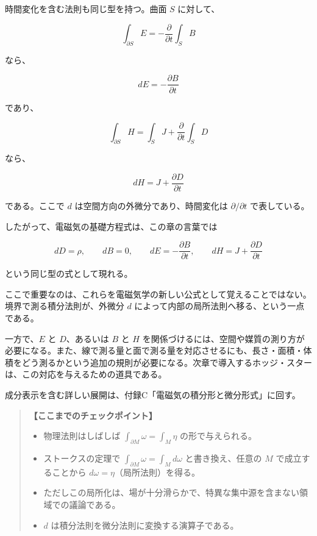 \documentclass[a4paper,12pt,openany]{book}
\begin{document}
時間変化を含む法則も同じ型を持つ。曲面 \(S\) に対して、

\[
\int_{\partial S}E
=
-\frac{\partial}{\partial t}\int_S B
\]

なら、

\[
dE=-\frac{\partial B}{\partial t}
\]

であり、

\[
\int_{\partial S}H
=
\int_SJ+\frac{\partial}{\partial t}\int_S D
\]

なら、

\[
dH=J+\frac{\partial D}{\partial t}
\]

である。ここで \(d\) は空間方向の外微分であり、時間変化は
\(\partial/\partial t\) で表している。

したがって、電磁気の基礎方程式は、この章の言葉では

\[
dD=\rho,\qquad
dB=0,\qquad
dE=-\frac{\partial B}{\partial t},\qquad
dH=J+\frac{\partial D}{\partial t}
\]

という同じ型の式として現れる。

ここで重要なのは、これらを電磁気学の新しい公式として覚えることではない。境界で測る積分法則が、外微分
\(d\) によって内部の局所法則へ移る、という一点である。

一方で、\(E\) と \(D\)、あるいは \(B\) と \(H\)
を関係づけるには、空間や媒質の測り方が必要になる。また、線で測る量と面で測る量を対応させるにも、長さ・面積・体積をどう測るかという追加の規則が必要になる。次章で導入するホッジ・スターは、この対応を与えるための道具である。

成分表示を含む詳しい展開は、付録C「電磁気の積分形と微分形式」に回す。

\begin{quote}
\textbf{【ここまでのチェックポイント】}

\begin{itemize}
\item
  物理法則はしばしば \(\int_{\partial M} \omega = \int_M \eta\)
  の形で与えられる。
\item
  ストークスの定理で \(\int_{\partial M} \omega = \int_M d\omega\)
  と書き換え、任意の \(M\) で成立することから
  \(d\omega = \eta\)（局所法則）を得る。
\item
  ただしこの局所化は、場が十分滑らかで、特異な集中源を含まない領域での議論である。
\item
  \(d\) は積分法則を微分法則に変換する演算子である。
\end{itemize}
\end{quote}

\par\vspace{0.35em}\par
\end{document}
